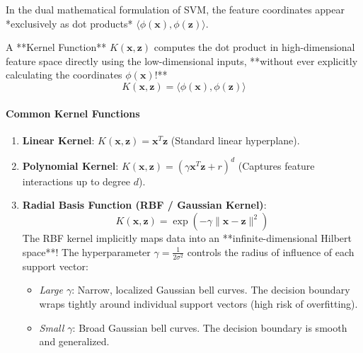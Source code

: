 \begin{keyidea}
In the dual mathematical formulation of SVM, the feature coordinates appear *exclusively as dot products* $\langle \phi(\mathbf{x}), \phi(\mathbf{z}) \rangle$. 

A **Kernel Function** $K(\mathbf{x}, \mathbf{z})$ computes the dot product in high-dimensional feature space directly using the low-dimensional inputs, **without ever explicitly calculating the coordinates $\phi(\mathbf{x})$!**
\begin{equation}
K(\mathbf{x}, \mathbf{z}) = \langle \phi(\mathbf{x}), \phi(\mathbf{z}) \rangle\label{eq:kernel_trick_def}
\end{equation}
\end{keyidea}

\paragraph{Common Kernel Functions}
\begin{enumerate}
    \item \textbf{Linear Kernel}: $K(\mathbf{x}, \mathbf{z}) = \mathbf{x}^T \mathbf{z}$ (Standard linear hyperplane).
    \item \textbf{Polynomial Kernel}: $K(\mathbf{x}, \mathbf{z}) = (\gamma \mathbf{x}^T \mathbf{z} + r)^d$ (Captures feature interactions up to degree $d$).
    \item \textbf{Radial Basis Function (RBF / Gaussian Kernel)}:
    \begin{equation}
    K(\mathbf{x}, \mathbf{z}) = \exp\left( -\gamma \|\mathbf{x} - \mathbf{z}\|^2 \right)\label{eq:rbf_kernel_def}
    \end{equation}
    The RBF kernel implicitly maps data into an **infinite-dimensional Hilbert space**! The hyperparameter $\gamma = \frac{1}{2\sigma^2}$ controls the radius of influence of each support vector:
    \begin{itemize}
        \item \textit{Large $\gamma$}: Narrow, localized Gaussian bell curves. The decision boundary wraps tightly around individual support vectors (high risk of overfitting).
        \item \textit{Small $\gamma$}: Broad Gaussian bell curves. The decision boundary is smooth and generalized.
    \end{itemize}
\end{enumerate}


